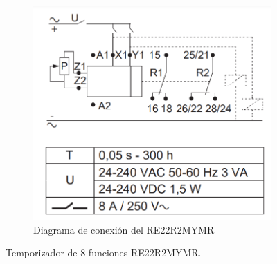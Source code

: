 \begin{figure}
\begin{subfigure}[b]{0.5\textwidth}
		\centering
		\includegraphics[width=\textwidth]{fig/TimerDiagram}
		\caption{Diagrama de conexión del RE22R2MYMR \cite{Scheneider4} }
		\label{fig:Diagrama}
	\end{subfigure}
	\caption{Temporizador de 8 funciones RE22R2MYMR.}
\end{figure}



